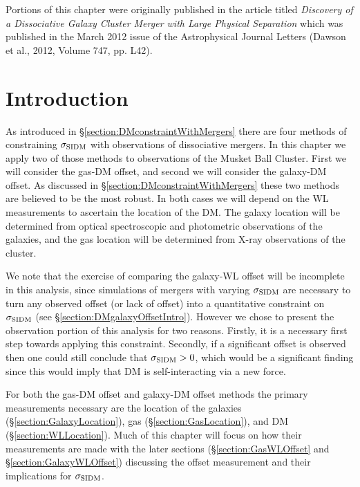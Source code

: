 \label{chapter:4}

\noindent Portions of this chapter were originally published in the article titled \emph{Discovery of a Dissociative Galaxy Cluster Merger with Large Physical Separation} which was published in the March 2012 issue of the Astrophysical Journal Letters (Dawson et al., 2012, Volume 747, pp. L42). \\

\section{Introduction}

As introduced in \S\ref{section:DMconstraintWithMergers} there are four methods of constraining $\sigma_{\rm SIDM}$ with observations of dissociative mergers.
In this chapter we apply two of those methods to observations of the Musket Ball Cluster.
First we will consider the gas-DM offset, and second we will consider the galaxy-DM offset.
As discussed in \S\ref{section:DMconstraintWithMergers} these two methods are believed to be the most robust.
In both cases we will depend on the WL measurements to ascertain the location of the DM.
The galaxy location will be determined from optical spectroscopic and photometric observations of the galaxies, and the gas location will be determined from X-ray observations of the cluster.

We note that the exercise of comparing the galaxy-WL offset will be incomplete in this analysis, since simulations of mergers with varying $\sigma_{\rm SIDM}$ are necessary to turn any observed offset (or lack of offset) into a quantitative constraint on $\sigma_{\rm SIDM}$ (see \S\ref{section:DMgalaxyOffsetIntro}). 
However we chose to present the observation portion of this analysis for two reasons.
Firstly, it is a necessary first step towards applying this constraint.
Secondly, if a significant offset is observed then one could still conclude that $\sigma_{\rm SIDM}>0$, which would be a significant finding since this would imply that DM is self-interacting via a new force.

For both the gas-DM offset and galaxy-DM offset methods the primary measurements necessary are the location of the galaxies (\S\ref{section:GalaxyLocation}), gas (\S\ref{section:GasLocation}), and DM (\S\ref{section:WLLocation}).
Much of this chapter will focus on how their measurements are made with the later sections (\S\ref{section:GasWLOffset} and \S\ref{section:GalaxyWLOffset}) discussing the offset measurement and their implications for $\sigma_{\rm SIDM}$.


